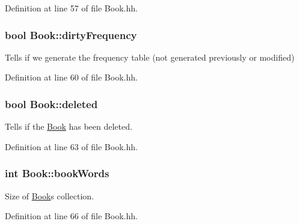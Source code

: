 Definition at line 57 of file Book.\+hh.

\subsubsection[{\texorpdfstring{dirty\+Frequency}{dirtyFrequency}}]{\setlength{\rightskip}{0pt plus 5cm}bool Book\+::dirty\+Frequency\hspace{0.3cm}{\ttfamily [private]}}\hypertarget{class_book_ad1df1050750f0605efdfab51b86c0765}{}\label{class_book_ad1df1050750f0605efdfab51b86c0765}


Tells if we generate the frequency table (not generated previously or modified) 



Definition at line 60 of file Book.\+hh.

\subsubsection[{\texorpdfstring{deleted}{deleted}}]{\setlength{\rightskip}{0pt plus 5cm}bool Book\+::deleted\hspace{0.3cm}{\ttfamily [private]}}\hypertarget{class_book_a1fba52d984d1651760cd79dc393415ab}{}\label{class_book_a1fba52d984d1651760cd79dc393415ab}


Tells if the \hyperlink{class_book}{Book} has been deleted. 



Definition at line 63 of file Book.\+hh.

\subsubsection[{\texorpdfstring{book\+Words}{bookWords}}]{\setlength{\rightskip}{0pt plus 5cm}int Book\+::book\+Words\hspace{0.3cm}{\ttfamily [private]}}\hypertarget{class_book_a36f1e0b30a0ad17606976556cab45a23}{}\label{class_book_a36f1e0b30a0ad17606976556cab45a23}


Size of \hyperlink{class_book}{Book}\textquotesingle{}s collection. 



Definition at line 66 of file Book.\+hh.

